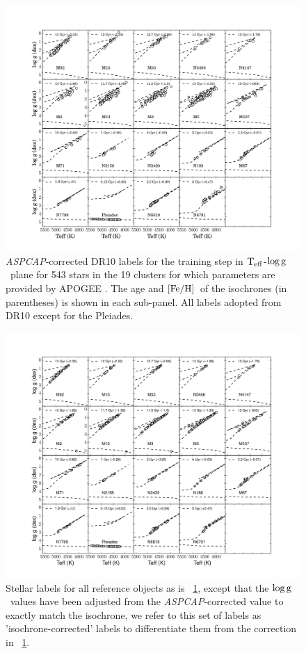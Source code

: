 \documentclass[12pt, preprint]{aastex}
\newcommand{\aspcap}{\textsl{ASPCAP}}
\newcommand{\teff}{\mbox{$\rm T_{eff}$}}
\newcommand{\feh}{\mbox{$\rm [Fe/H]$}}
\newcommand{\logg}{\mbox{$\rm \log g$}}
\begin{document}
\begin{figure}[h!]
\centering
    \includegraphics[scale=0.33]{./plots/training_aspcap.pdf}
\caption{\aspcap-corrected DR10 labels  for the training step in \teff-\logg\ plane for 543 stars in the 19 clusters for which parameters are provided by APOGEE \citep{Meszaros2013}. The age and \feh\ of the isochrones (in parentheses) is shown in each sub-panel. All labels adopted from DR10 except for the Pleiades. }
\label{fig:trainingaspcap}
\end{figure}

\begin{figure}[h!]
\centering
  \includegraphics[scale=0.33]{./plots/training_mkn2.pdf}
\caption{Stellar labels for all reference objects as is \figurename~\ref{fig:trainingaspcap}, except that the \logg\ values have been adjusted from the \aspcap-corrected value to exactly match the isochrone, we refer to this set of labels as  'isochrone-corrected' labels to differentiate them from the correction in \figurename~\ref{fig:trainingaspcap}.  }
\label{fig:trainingisochrone}
\end{figure}
\end{document}
